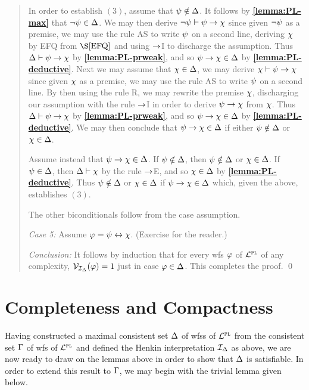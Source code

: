 \begin{quote}
  In order to establish $(3)$, assume that $\psi \notin \Delta$.
  It follows by \textbf{\ref{lemma:PL-max}} that $\neg \psi \in \Delta$.
  We may then derive $\neg \psi \vdash \psi \rightarrow \chi$ since given $\neg \psi$ as a premise, we may use the rule AS to write $\psi$ on a second line, deriving $\chi$ by EFQ from $\S\ref{EFQ}$ and using $\rightarrow$I to discharge the assumption.
  Thus $\Delta\vdash\psi\rightarrow\chi$ by \textbf{\ref{lemma:PL-prweak}}, and so $\psi\rightarrow\chi\in\Delta$ by \textbf{\ref{lemma:PL-deductive}}.
  Next we may assume that $\chi\in\Delta$, we may derive $\chi\vdash\psi\rightarrow\chi$ since given $\chi$ as a premise, we may use the rule AS to write $\psi$ on a second line.
  By then using the rule R, we may rewrite the premise $\chi$, discharging our assumption with the rule $\rightarrow$I in order to derive $\psi\rightarrow\chi$ from $\chi$. 
  Thus $\Delta\vdash\psi\rightarrow\chi$ by \textbf{\ref{lemma:PL-prweak}}, and so $\psi\rightarrow\chi\in\Delta$ by \textbf{\ref{lemma:PL-deductive}}.
  We may then conclude that $\psi\rightarrow\chi\in\Delta$ if either $\psi\notin\Delta$ or $\chi\in\Delta$.

  Assume instead that $\psi\rightarrow\chi\in\Delta$.
  If $\psi\notin\Delta$, then $\psi\notin\Delta$ or $\chi\in\Delta$.
  If $\psi\in\Delta$, then $\Delta\vdash\chi$ by the rule $\rightarrow$E, and so $\chi\in\Delta$ by \textbf{\ref{lemma:PL-deductive}}.
  Thus $\psi\notin\Delta$ or $\chi\in\Delta$ if $\psi\rightarrow\chi\in\Delta$ which, given the above, establishes $(3)$.  

  The other biconditionals follow from the case assumption.

  \textit{Case 5:}
  Assume $\varphi=\psi\leftrightarrow\chi$.
  (Exercise for the reader.)

  \textit{Conclusion:}
  It follows by induction that for every wfs $\varphi$ of $\mathcal{L}^{\textsc{pl}}$ of any complexity, $\mathcal{V}_{\mathcal{I}_{\Delta}}(\varphi) = 1$ just in case $\varphi\in\Delta$. 
  This completes the proof.
  \qed
\end{quote}





\section{Completeness and Compactness}%
  \label{sec:PL-CompleteCompact}

Having constructed a maximal consistent set $\Delta$ of wfss of $\mathcal{L}^{\textsc{pl}}$ from the consistent set $\Gamma$ of wfs of $\mathcal{L}^{\textsc{pl}}$ and defined the Henkin interpretation $\mathcal{I}_{\Delta}$ as above, we are now ready to draw on the lemmas above in order to show that $\Delta$ is satisfiable.
In order to extend this result to $\Gamma$, we may begin with the trivial lemma given below. 

